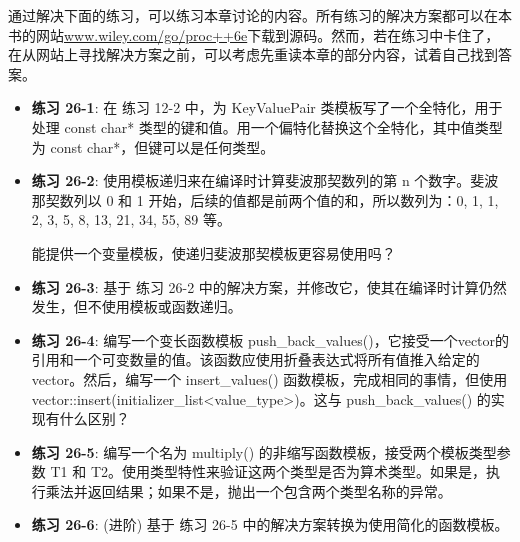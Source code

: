 通过解决下面的练习，可以练习本章讨论的内容。所有练习的解决方案都可以在本书的网站\url{www.wiley.com/go/proc++6e}下载到源码。然而，若在练习中卡住了，在从网站上寻找解决方案之前，可以考虑先重读本章的部分内容，试着自己找到答案。

\begin{itemize}
\item
\textbf{练习 26-1}: 在 练习 12-2 中，为 KeyValuePair 类模板写了一个全特化，用于处理 const char* 类型的键和值。用一个偏特化替换这个全特化，其中值类型为 const char*，但键可以是任何类型。

\item
\textbf{练习 26-2}: 使用模板递归来在编译时计算斐波那契数列的第 n 个数字。斐波那契数列以 0 和 1 开始，后续的值都是前两个值的和，所以数列为：0, 1, 1, 2, 3, 5, 8, 13, 21, 34, 55, 89 等。

能提供一个变量模板，使递归斐波那契模板更容易使用吗？

\item
\textbf{练习 26-3}: 基于 练习 26-2 中的解决方案，并修改它，使其在编译时计算仍然发生，但不使用模板或函数递归。

\item
\textbf{练习 26-4}: 编写一个变长函数模板 push\_back\_values()，它接受一个vector的引用和一个可变数量的值。该函数应使用折叠表达式将所有值推入给定的vector。然后，编写一个 insert\_values() 函数模板，完成相同的事情，但使用 vector::insert(initializer\_list<value\_type>)。这与 push\_back\_values() 的实现有什么区别？

\item
\textbf{练习 26-5}: 编写一个名为 multiply() 的非缩写函数模板，接受两个模板类型参数 T1 和 T2。使用类型特性来验证这两个类型是否为算术类型。如果是，执行乘法并返回结果；如果不是，抛出一个包含两个类型名称的异常。

\item
\textbf{练习 26-6}: (进阶) 基于 练习 26-5 中的解决方案转换为使用简化的函数模板。
\end{itemize}





















